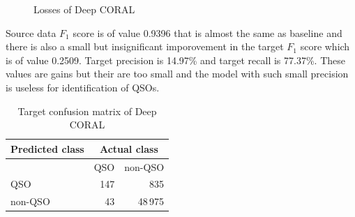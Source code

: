 \begin{figure}
	\caption{Losses of Deep CORAL}
\end{figure}

Source data \(F_1\) score is of value 0.9396
that is almost the same as baseline
and there is also a small but insignificant imporovement in the target \(F_1\) score
which is of value 0.2509.
Target precision is 14.97\% and target recall is 77.37\%.
These values are gains but their are too small
and the model with such small precision is useless for identification of QSOs.

\begin{table}
\begin{center}
\begin{tabular}{|l|r|r|}
	\hline
	Predicted class & \multicolumn{2}{c|}{Actual class} \\
	\hline \hline
	& QSO & non-QSO \\ \hline
	QSO & 147 & 835 \\ \hline
	non-QSO & 43 & 48\,975 \\ \hline
\end{tabular}
\end{center}
\caption{Target confusion matrix of Deep CORAL}
\end{table}


